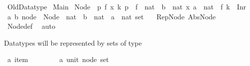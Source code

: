 %
\begin{isabellebody}%
%
%
\isadelimdocument
%
\endisadelimdocument
%
\isatagdocument
%
\isamarkuptrue%
%
\endisatagdocument
{\isafolddocument}%
%
\isadelimdocument
%
\endisadelimdocument
%
\isadelimtheory
%
\endisadelimtheory
%
\isatagtheory
{}\isamarkupfalse%
\ Old{\isacharunderscore}Datatype\isanewline
{}\ Main\isanewline
{}%
\endisatagtheory
{\isafoldtheory}%
%
\isadelimtheory
%
\endisadelimtheory
%
\isadelimdocument
%
\endisadelimdocument
%
\isatagdocument
%
\isamarkuptrue%
%
\endisatagdocument
{\isafolddocument}%
%
\isadelimdocument
%
\endisadelimdocument
{}\isamarkupfalse%
\ {\isachardoublequoteopen}Node\ {\isacharequal}\ {\isacharbraceleft}p{\isachardot}\ {\isasymexists}f\ x\ k{\isachardot}\ p\ {\isacharequal}\ {\isacharparenleft}f\ {\isacharcolon}{\isacharcolon}\ nat\ {\isacharequal}{\isachargreater}\ {\isacharprime}b\ {\isacharplus}\ nat{\isacharcomma}\ x\ {\isacharcolon}{\isacharcolon}{\isacharprime}a\ {\isacharplus}\ nat{\isacharparenright}\ {\isasymand}\ f\ k\ {\isacharequal}\ Inr\ {}{\isacharbraceright}{\isachardoublequoteclose}\isanewline
\isanewline
{}\isamarkupfalse%
\ {\isacharparenleft}{\isacharprime}a{\isacharcomma}\ {\isacharprime}b{\isacharparenright}\ node\ {\isacharequal}\ {\isachardoublequoteopen}Node\ {\isacharcolon}{\isacharcolon}\ {\isacharparenleft}{\isacharparenleft}nat\ {\isacharequal}{\isachargreater}\ {\isacharprime}b\ {\isacharplus}\ nat{\isacharparenright}\ {\isacharasterisk}\ {\isacharparenleft}{\isacharprime}a\ {\isacharplus}\ nat{\isacharparenright}{\isacharparenright}\ set{\isachardoublequoteclose}\isanewline
\ \ \ Rep{\isacharunderscore}Node\ Abs{\isacharunderscore}Node\isanewline
%
\isadelimproof
\ \ %
\endisadelimproof
%
\isatagproof
{}\isamarkupfalse%
\ Node{\isacharunderscore}def\ \isamarkupfalse%
\ auto%
\endisatagproof
{\isafoldproof}%
%
\isadelimproof
%
\endisadelimproof
%
\begin{isamarkuptext}%
Datatypes will be represented by sets of type %
\end{isamarkuptext}\isamarkuptrue%
\isamarkupfalse%
\ {\isacharprime}a\ item\ \ \ \ \ \ \ \ {\isacharequal}\ {\isachardoublequoteopen}{\isacharparenleft}{\isacharprime}a{\isacharcomma}\ unit{\isacharparenright}\ node\ set{\isachardoublequoteclose}\isanewline

\end{isabellebody}
